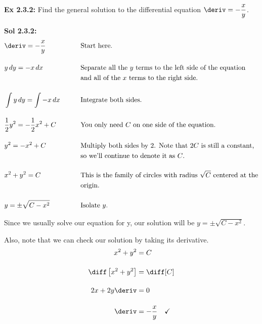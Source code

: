 \begin{tcolorbox}[example]
    \textbf{Ex 2.3.2: } Find the general solution to the differential equation $\deriv = -\dfrac{x}{y}$.
\end{tcolorbox}
\begin{tcolorbox}[solution]
    \textbf{Sol 2.3.2: } \vspace{11pt} \begin{alignat*}{2}
        & \deriv = -\frac{x}{y} &\qquad& \text{Start here.} \\[11pt]
        & y \, dy = -x \, dx &\qquad& \text{Separate all the $y$ terms to the left side of the equation} \\
        &  &\qquad& \text{and all of the $x$ terms to the right side.} \\[11pt]
        & \int y \, dy = \int -x \, dx &\qquad& \text{Integrate both sides.} \\[11pt]
        & \frac{1}{2}y^2 = -\frac{1}{2}x^2 + C &\qquad& \text{You only need $C$ on one side of the equation.} \\[11pt]
        & y^2 = -x^2 + C &\qquad& \text{Multiply both sides by 2. Note that $2C$ is still a constant,} \\
        &  &\qquad& \text{so we'll continue to denote it as $C$.} \\[11pt]
        & x^2 + y^2 = C &\qquad& \text{This is the family of circles with radius $\sqrt{C}$ centered at the} \\
        &  &\qquad& \text{origin.} \\[11pt]
        & y = \pm\sqrt{C - x^2} &\qquad& \text{Isolate $y$.}
    \end{alignat*}

    Since we usually solve our equation for y, our solution will be $\boxed{y = \pm\sqrt{C - x^2}}$. \par
    \vspace{11pt}
    Also, note that we can check our solution by taking its derivative. \begin{align*}
        x^2 + y^2 &= C \\[11pt]
        \diff \left[x^2 + y^2\right] &= \diff [C] \\[11pt]
        2x + 2y\deriv &= 0 \\[11pt]
        \deriv &= -\dfrac{x}{y} \quad \checkmark
    \end{align*}
\end{tcolorbox} \vspace{11pt}

